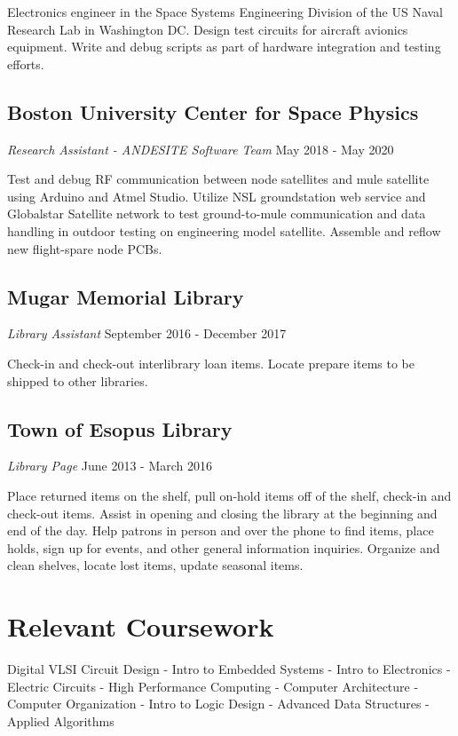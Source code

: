 \documentclass{article}
\begin{document}
Electronics engineer in the Space Systems Engineering Division of the US Naval Research Lab in Washington DC. Design test circuits for aircraft avionics equipment. Write and debug scripts as part of hardware integration and testing efforts.
\vspace{-.75em}
\subsection{Boston University Center for Space Physics}  \textit{Research Assistant - ANDESITE Software Team}
  May 2018 - May 2020

Test and debug RF communication between node satellites and mule satellite using Arduino and Atmel Studio. Utilize NSL groundstation web service and Globalstar Satellite network to test ground-to-mule communication and data handling in outdoor testing on engineering model satellite. Assemble and reflow new flight-spare node PCBs.
\vspace{-.75em}
\subsection{Mugar Memorial Library} \textit{Library Assistant}
  September 2016 - December 2017

Check-in and check-out interlibrary loan items. Locate prepare items to be shipped to other libraries.
\vspace{-.75em}
\subsection{Town of Esopus Library} \textit{Library Page}
  June 2013 - March 2016

Place returned items on the shelf, pull on-hold items off of the shelf, check-in and check-out items. Assist in opening and closing the library at the beginning and end of the day. Help patrons in person and over the phone to find items, place holds, sign up for events, and other general information inquiries. Organize and clean shelves, locate lost items, update seasonal items.

\vspace{-.75em}
\section{Relevant Coursework}
{\centering
Digital VLSI Circuit Design - Intro to Embedded Systems - Intro to Electronics - Electric Circuits - High Performance Computing - Computer Architecture - Computer Organization - Intro to Logic Design - Advanced Data Structures - Applied Algorithms
\par
}
\end{document}
